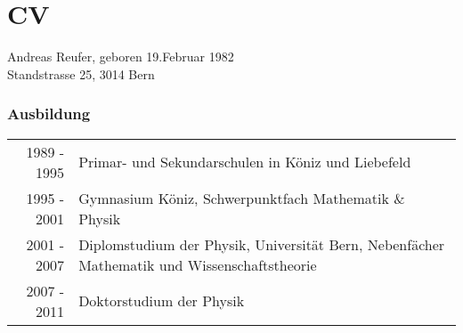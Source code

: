 

\chapter*{CV}

{ \large Andreas Reufer, geboren 19.Februar 1982} \\
{ \large Standstrasse 25, 3014 Bern} \\

\subsection*{Ausbildung}
\begin{tabular}{rp{12.0cm}}
1989 - 1995 & Primar- und Sekundarschulen in Köniz und Liebefeld\\
1995 - 2001 & Gymnasium Köniz, Schwerpunktfach Mathematik \& Physik \\
2001 - 2007 & Diplomstudium der Physik, Universität Bern, Nebenfächer Mathematik und Wissenschaftstheorie \\
2007 - 2011 & Doktorstudium der Physik \\
\end{tabular}



